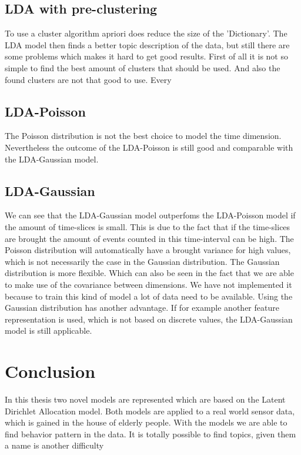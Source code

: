 \documentclass[11pt,a4paper]{article}
\begin{document}
\subsection{LDA with pre-clustering}
To use a cluster algorithm apriori does reduce the size of the 'Dictionary'. The LDA model then finds a better topic description of the data, but still there are some problems which makes it hard to get good results. First of all it is not so simple to find the best amount of clusters that should be used. And also the found clusters are not that good to use. Every 

\subsection{LDA-Poisson}
The Poisson distribution is not the best choice to model the time dimension. Nevertheless the outcome of the LDA-Poisson is still good and comparable with the LDA-Gaussian model.

\subsection{LDA-Gaussian}
We can see that the LDA-Gaussian model outperfoms the LDA-Poisson model if the amount of time-slices is small. This is due to the fact that if the time-slices are brought the amount of events counted in this time-interval can be high. The Poisson distribution will automatically have a brought variance for high values, which is not necessarily the case in the Gaussian distribution. The Gaussian distribution is more flexible. Which can also be seen in the fact that we are able to make use of the covariance between dimensions. We have not implemented it because to train this kind of model a lot of data need to be available.
Using the Gaussian distribution has another advantage. If for example another feature representation is used, which is not based on discrete values, the LDA-Gaussian model is still applicable.\\

\section{Conclusion}
\label{sec:Conc}
In this thesis two novel models are represented which are based on the Latent Dirichlet Allocation model. Both models are applied to a real world sensor data, which is gained in the house of elderly people. With the models we are able to find behavior pattern in the data.
It is totally possible to find topics, given them a name is another difficulty


\appendix

{}

\end{document}
